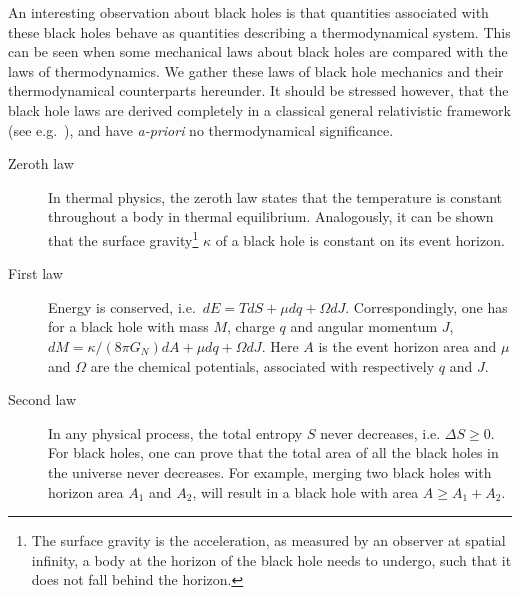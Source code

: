 \documentclass[12pt,twoside]{book}
\begin{document}
An interesting observation about black holes is that quantities associated with these black holes behave as quantities describing a thermodynamical system. This can be seen when some mechanical laws about black holes are compared with the laws of thermodynamics. We gather these laws of black hole mechanics and their thermodynamical counterparts hereunder. It should be stressed however, that the black hole laws are derived completely in a classical general relativistic framework (see e.g.\ \cite{Wald:1984rg}), and have \emph{a-priori} no thermodynamical significance.
\begin{description}
\item[Zeroth law]
In thermal physics, the zeroth law states that the temperature is constant throughout a body in thermal equilibrium. Analogously, it can be shown that the surface gravity\footnote{The surface gravity is the acceleration, as measured by an observer at spatial infinity, a body at the horizon of the black hole needs to undergo, such that it does not fall behind the horizon.
}
$\kappa$ of a black hole is constant on its event horizon.
%
\item[First law]
Energy is conserved, i.e.\ $dE = T dS + \mu d q + \Omega dJ $. Correspondingly, one has for a black hole with mass $M$, charge $q$ and angular momentum $J$, $dM = \kappa / (8 \pi G_{N}) dA + \mu d q + \Omega dJ$. Here $A$ is the event horizon area and $\mu$ and $\Omega$ are the chemical potentials, associated with respectively $q$ and $J$.
%
\item[Second law]
In any physical process, the total entropy $S$ never decreases, i.e. $\Delta S \geq 0$. For black holes, one can prove that the total area of all the black holes in the universe never decreases. For example, merging two black holes with horizon area $A_{1}$ and $A_{2}$, will result in a black hole with area $A \geq A_{1} + A_{2}$.
\end{description}
\end{document}
